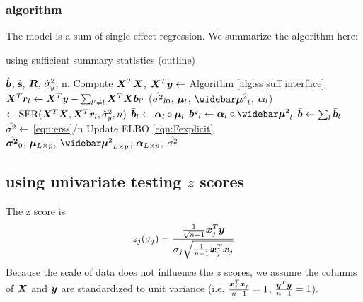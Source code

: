 \subsubsection{\susie algorithm}
The \susie model is a sum of single effect regression. We summarize the algorithm here:
\begin{algorithm}[H] 
\caption{\susie using sufficient summary statistics (outline)} \label{alg:susiealg}
\begin{algorithmic}[1]
\Require $\hat{\bm b}$, $\hat{\bm{s}}$, $\bm R$, $\hat{\sigma}_y^2$, n.
\State Compute $\bm X^T \bm X$, $\bm X^{T}\bm y \gets $ Algorithm \ref{alg:ss suff interface} 
\Repeat
{}
	\State $\bm X^{T}\bm r_l \gets \bm X^{T}\bm y - \sum_{l'\neq l} \bm X^{T}\bm X \bar{\bm b}_{l'}$ 
    \State ($\hat{\sigma^2}_{l0}$, $\bm \mu_l$, $\emusq_l$, $\bm \alpha_l$) $\gets \text{SER}(\bm X^T\bm X, \bm X^T\bm r_l,\hat{\sigma}_y^2, n)$ 
    \State $\bar{\bm b}_l \gets \bm \alpha_l \circ \bm \mu_l$ 
    \State $\bar{\vb^2}_l \gets \valpha_l \circ \emusq_l$ 
\EndFor
\State $\bar{\bm b} \gets \sum_l \bar{\bm b}_l$
\State $\hat{\sigma^2} \gets$ \eqref{eqn:erss}/n
\State Update ELBO \eqref{eqn:Fexplicit}
 \\
\Return $\hat{\bm {\sigma^2}}_0$, $\bm \mu_{L\times p}$, $\emusq_{L\times p}$, $\bm \alpha_{L\times p}$, $\hat{\sigma^2}$
\end{algorithmic}
\end{algorithm}

\subsection{\susie using univariate testing $z$ scores}
The z score is 
\begin{equation}
    z_{j}(\sigma_j) = \frac{\frac{1}{\sqrt{n-1}}\bm x_j^T \bm y}{\sigma_j \sqrt{\frac{1}{n-1}\bm x_j^T\bm x_j}} \label{eqn:z}
\end{equation}
Because the scale of data does not influence the $z$ scores, we assume the columns of $\bm X$ and $\bm y$ are standardized to unit variance (i.e. $\frac{\bm x_j^T\bm x_j}{n-1} = 1$, $\frac{\bm y^T\bm y}{n-1}=1$).
